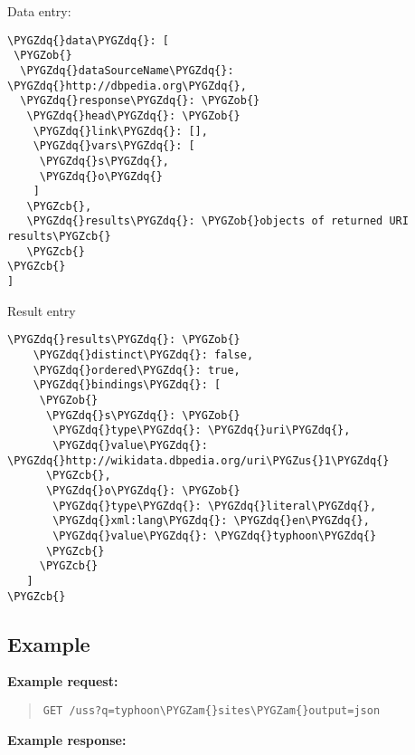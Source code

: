 \documentclass[letterpaper,10pt,english]{sphinxmanual}
\def\PYGZus{\char`\_}
\def\PYGZob{\char`\{}
\def\PYGZcb{\char`\}}
\def\PYGZam{\char`\&}
\def\PYGZdq{\char`\"}
\begin{document}
Data entry:

\begin{Verbatim}[commandchars=\\\{\}]
\PYGZdq{}data\PYGZdq{}: [
 \PYGZob{}
  \PYGZdq{}dataSourceName\PYGZdq{}: \PYGZdq{}http://dbpedia.org\PYGZdq{},
  \PYGZdq{}response\PYGZdq{}: \PYGZob{}
   \PYGZdq{}head\PYGZdq{}: \PYGZob{}
    \PYGZdq{}link\PYGZdq{}: [],
    \PYGZdq{}vars\PYGZdq{}: [
     \PYGZdq{}s\PYGZdq{},
     \PYGZdq{}o\PYGZdq{}
    ]
   \PYGZcb{},
   \PYGZdq{}results\PYGZdq{}: \PYGZob{}objects of returned URI results\PYGZcb{}
   \PYGZcb{}
\PYGZcb{}
]
\end{Verbatim}

Result entry

\begin{Verbatim}[commandchars=\\\{\}]
\PYGZdq{}results\PYGZdq{}: \PYGZob{}
    \PYGZdq{}distinct\PYGZdq{}: false,
    \PYGZdq{}ordered\PYGZdq{}: true,
    \PYGZdq{}bindings\PYGZdq{}: [
     \PYGZob{}
      \PYGZdq{}s\PYGZdq{}: \PYGZob{}
       \PYGZdq{}type\PYGZdq{}: \PYGZdq{}uri\PYGZdq{},
       \PYGZdq{}value\PYGZdq{}: \PYGZdq{}http://wikidata.dbpedia.org/uri\PYGZus{}1\PYGZdq{}
      \PYGZcb{},
      \PYGZdq{}o\PYGZdq{}: \PYGZob{}
       \PYGZdq{}type\PYGZdq{}: \PYGZdq{}literal\PYGZdq{},
       \PYGZdq{}xml:lang\PYGZdq{}: \PYGZdq{}en\PYGZdq{},
       \PYGZdq{}value\PYGZdq{}: \PYGZdq{}typhoon\PYGZdq{}
      \PYGZcb{}
     \PYGZcb{}
   ]
\PYGZcb{}
\end{Verbatim}


\subsection{Example}
\label{docs/uss:example}
\textbf{Example request:}
\begin{quote}

\begin{Verbatim}[commandchars=\\\{\}]
GET /uss?q=typhoon\PYGZam{}sites\PYGZam{}output=json
\end{Verbatim}
\end{quote}

\textbf{Example response:}
\end{document}
